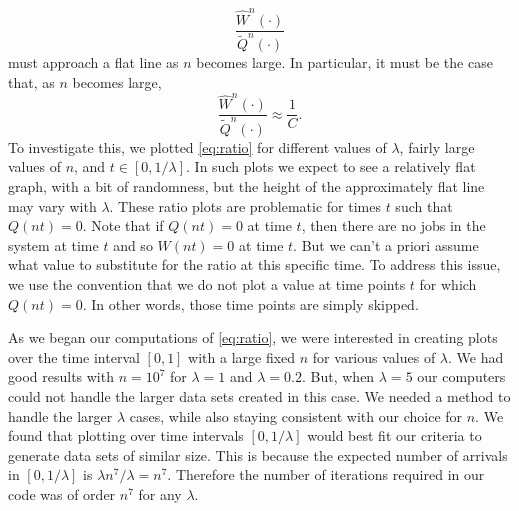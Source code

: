 \documentclass[12pt]{article}
\theoremstyle{plain}
\theoremstyle{definition}
\theoremstyle{remark}
\newcommand{\Wfhat}{\widehat{W}^{n}(\cdot)}
\newcommand{\Qftild}{\widetilde{Q}^{n}(\cdot)}
\begin{document}
\begin{equation}\label{eq:ratio}
\frac{\Wfhat}{\Qftild}
\end{equation}
must approach a flat line as $n$ becomes large.  In particular, it must
be the case that, as $n$ becomes large,
\begin{equation}\label{eq:R}
\frac{\Wfhat}{\Qftild} \approx \frac{1}{C}.
\end{equation}
To investigate this, we plotted \eqref{eq:ratio} for different values of $\lambda$, fairly large values of $n$, and $t\in[0,1/\lambda]$.  In such plots we expect to see a relatively flat graph, with a bit of randomness, but the height of the approximately flat line may vary with $\lambda$.  These ratio plots are problematic for times $t$ such that $Q(nt) = 0$.  Note that if $Q(nt) = 0$ at time $t$, then there are no jobs in the system at time $t$ and
so $W(nt) = 0$ at time $t$.  But we can't a priori assume what value to substitute for the ratio at this specific time.
To address this issue, we use the convention that we do not plot a value at time points $t$ for which $Q(nt) = 0$.  In other words, those time points are simply skipped.

As we began our computations of \eqref{eq:ratio}, we were interested in creating plots over the time interval $[0,1]$ with a large fixed $n$ for various values of $\lambda$. We had good results with $n=10^{7}$ for $\lambda = 1$ and $\lambda = 0.2$. But, when $\lambda = 5$ our computers could not handle the larger data sets created in this case.
We needed a method to handle the larger $\lambda$ cases, while also staying consistent with our choice for $n$. We found that plotting over time intervals $[0,1/\lambda]$ would best fit our criteria to generate data sets of similar size.  This is because the expected number of arrivals in $[0,1/\lambda]$ is $\lambda n^7/\lambda = n^7$. Therefore the number of iterations required in our code was of order $n^7$ for any $\lambda$.
\end{document}
